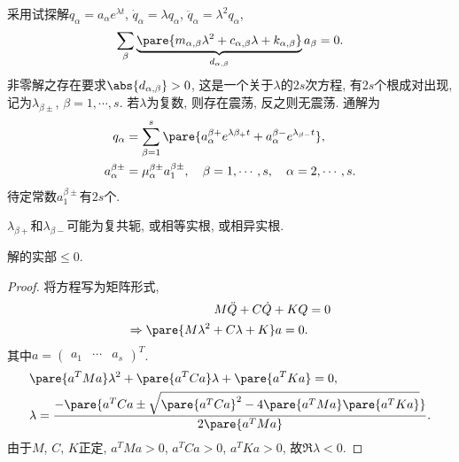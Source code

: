 \documentclass{ctexart}
\begin{document}
采用试探解$q_\alpha = a_\alpha e^{\lambda t}$, $\dot{q}_\alpha = \lambda q_\alpha$, $\ddot{q}_\alpha = \lambda^2 q_\alpha$,
\[ \sum_\beta \underbrace{\pare{m_{\alpha,\beta} \lambda^2 + c_{\alpha,\beta} \lambda + k_{\alpha,\beta}}}_{d_{\alpha,\beta}}a_\beta = 0. \]
非零解之存在要求$\abs{d_{\alpha,\beta}}>0$, 这是一个关于$\lambda$的$2s$次方程, 有$2s$个根成对出现, 记为$\lambda_{\beta\pm}$, $\beta = 1,\cdots,s$. 若$\lambda$为复数, 则存在震荡, 反之则无震荡. 通解为
\begin{align*}
    q_\alpha &= \sum_{\beta=1}^s \pare{a_\alpha^{\beta+}e^{\lambda\beta_+ t} + a_\alpha^{\beta-}e^{\lambda_{\beta-}t}}, \\
    a_\alpha^{\beta\pm} &= \mu_\alpha^{\beta\pm} a_1^{\beta\pm},\quad \beta = 1,\cdots,s,\quad \alpha = 2,\cdots, s.
\end{align*}
待定常数$a_1^{\beta\pm}$有$2s$个.
\begin{remark}
    $\lambda_{\beta+}$和$\lambda_{\beta-}$可能为复共轭, 或相等实根, 或相异实根.
\end{remark}
\begin{proposition}
    解的实部$\le 0$.
\end{proposition}
\begin{proof}
    将方程写为矩阵形式,
    \begin{align*}
        M\ddot{Q} + C\dot{Q} + KQ &= 0 \\
        \Rightarrow \pare{M\lambda^2 + C\lambda + K} a = 0.
    \end{align*}
    其中$\displaystyle a=\begin{pmatrix}
        a_1 & \cdots & a_s
    \end{pmatrix}^T$.
    \begin{align*}
        & \pare{a^TMa}\lambda^2 +\pare{a^TCa}\lambda + \pare{a^TKa} = 0,\\
        & \lambda = \frac{-\pare{a^TCa \pm \sqrt{\pare{a^TCa}^2 - 4\pare{a^TMa}\pare{a^TKa}}}}{2\pare{a^TMa}}.
    \end{align*}
    由于$M$, $C$, $K$正定, $a^TMa > 0$, $a^TCa>0$, $a^TKa>0$, 故$\Re\lambda < 0$.
\end{proof}
\end{document}
